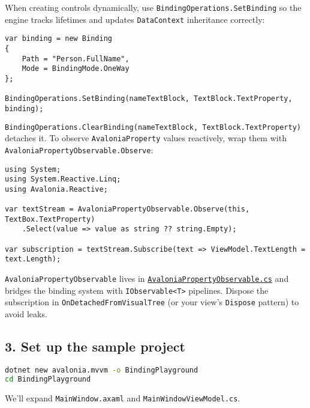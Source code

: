 When creating controls dynamically, use
\passthrough{\lstinline!BindingOperations.SetBinding!} so the engine
tracks lifetimes and updates \passthrough{\lstinline!DataContext!}
inheritance correctly:

\begin{lstlisting}
var binding = new Binding
{
    Path = "Person.FullName",
    Mode = BindingMode.OneWay
};

BindingOperations.SetBinding(nameTextBlock, TextBlock.TextProperty, binding);
\end{lstlisting}

\passthrough{\lstinline!BindingOperations.ClearBinding(nameTextBlock, TextBlock.TextProperty)!}
detaches it. To observe \passthrough{\lstinline!AvaloniaProperty!}
values reactively, wrap them with
\passthrough{\lstinline!AvaloniaPropertyObservable.Observe!}:

\begin{lstlisting}
using System;
using System.Reactive.Linq;
using Avalonia.Reactive;

var textStream = AvaloniaPropertyObservable.Observe(this, TextBox.TextProperty)
    .Select(value => value as string ?? string.Empty);

var subscription = textStream.Subscribe(text => ViewModel.TextLength = text.Length);
\end{lstlisting}

\passthrough{\lstinline!AvaloniaPropertyObservable!} lives in
\href{https://github.com/AvaloniaUI/Avalonia/blob/master/src/Avalonia.Base/Reactive/AvaloniaPropertyObservable.cs}{\passthrough{\lstinline!AvaloniaPropertyObservable.cs!}}
and bridges the binding system with
\passthrough{\lstinline!IObservable<T>!} pipelines. Dispose the
subscription in \passthrough{\lstinline!OnDetachedFromVisualTree!} (or
your view's \passthrough{\lstinline!Dispose!} pattern) to avoid leaks.

\subsection{3. Set up the sample
project}\label{set-up-the-sample-project}

\begin{lstlisting}[language=bash]
dotnet new avalonia.mvvm -o BindingPlayground
cd BindingPlayground
\end{lstlisting}

We'll expand \passthrough{\lstinline!MainWindow.axaml!} and
\passthrough{\lstinline!MainWindowViewModel.cs!}.

